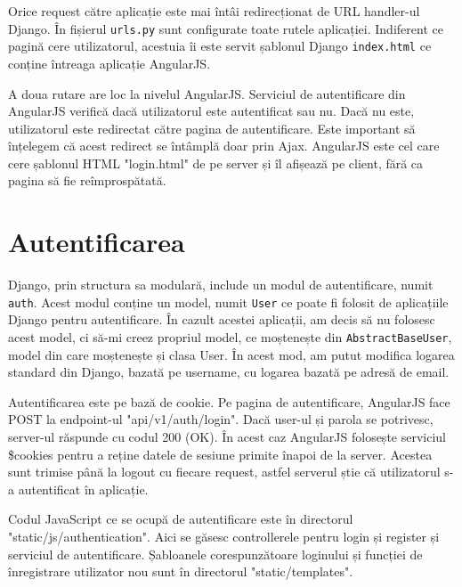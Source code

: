 Orice request către aplicație este mai întâi redirecționat
de URL handler-ul Django. În fișierul \texttt{urls.py} sunt
configurate toate rutele aplicației. Indiferent ce pagină
cere utilizatorul, acestuia îi este servit șablonul Django
\texttt{index.html} ce conține întreaga aplicație AngularJS.

A doua rutare are loc la nivelul AngularJS. Serviciul de autentificare
din AngularJS verifică dacă utilizatorul este autentificat sau nu.
Dacă nu este, utilizatorul este redirectat către pagina de autentificare.
Este important să înțelegem că acest redirect se întâmplă
doar prin Ajax. AngularJS este cel care cere șablonul HTML
"login.html" de pe server și îl afișează pe client, fără ca pagina
să fie reîmprospătată.

\section{Autentificarea}

Django, prin structura sa modulară, include un modul de autentificare,
numit \texttt{auth}. Acest modul conține un model, numit \texttt{User}
ce poate fi folosit de aplicațiile Django pentru autentificare.
În cazult acestei aplicații, am decis să nu folosesc acest model,
ci să-mi creez propriul model, ce moștenește din \texttt{AbstractBaseUser},
model din care moștenește și clasa User.
În acest mod, am putut modifica logarea standard din Django, bazată
pe username, cu logarea bazată pe adresă de email.



Autentificarea este pe bază de cookie. Pe pagina de autentificare,
AngularJS face POST la endpoint-ul "api/v1/auth/login". Dacă
user-ul și parola se potrivesc, server-ul răspunde cu codul 200 (OK).
În acest caz AngularJS folosește serviciul \$cookies pentru a reține
datele de sesiune primite înapoi de la server. Acestea sunt trimise
până la logout cu fiecare request, astfel serverul știe
că utilizatorul s-a autentificat în aplicație.

Codul JavaScript ce se ocupă de autentificare este în directorul
"static/js/authentication". Aici se găsesc controllerele pentru login și
register și serviciul de autentificare. Șabloanele corespunzătoare
loginului și funcției de înregistrare utilizator nou sunt în directorul
"static/templates".

